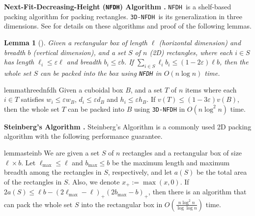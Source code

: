 \documentclass[10pt,a4paper]{amsart}
\newcommand{\kvn}[1]{#1}
\newcommand{\kvnr}[1]{}
\renewcommand{\epsilon}{\varepsilon} %
\newcommand{\boxes}{containers\xspace}
\newcommand{\NFDH}{\texttt{NFDH}\xspace}
\newcommand{\tNFDH}{\texttt{3D-NFDH}\xspace}
\newtheorem{lemma}[theorem]{Lemma}
\theoremstyle{definition}
\begin{document}

\noindent \textbf{Next-Fit-Decreasing-Height (\NFDH) Algorithm \cite{coffman1980performance}.}
\NFDH~is a shelf-based packing algorithm for packing rectangles. \tNFDH~is its generalization in three dimensions.
See  for details on these algorithms and proof of the following lemmas.

\begin{lemma}[\cite{2dks-Lpacking}]
\label{lem:2d-hfdh}
    Given a rectangular box of length $\ell$ (horizontal dimension) and breadth $b$ (vertical dimension), 
    and a set $S$ \kvn{of $n$} (2D) \kvn{rectangles}, where each $i\in S$ has length $\ell_i \le \epsilon\ell$ 
    and breadth $b_i \le \epsilon b$. If $\sum_{i\in S} \ell_i b_i \le (1-2\epsilon)\ell b$, then the whole set $S$ can be packed into the box using \NFDH in $O(n \log n)$ time.
\end{lemma}

\begin{restatable}{lemma}{threednfdh}
\label{lem:3d-hfdh}
    Given a cuboidal box $B$, and a set $T$ \kvn{of $n$} items where each $i\in T$ satisfies $w_i\le \epsilon w_B$, $d_i \le \epsilon d_B$ and $h_i \le \epsilon h_B$. If $v(T) \le (1-3\epsilon)v(B)$, then the whole set $T$ can be packed into $B$ using \tNFDH in $O(n \log^2 n)$ time.
\end{restatable}


\noindent \textbf{Steinberg's Algorithm \cite{steinberg}.} 
Steinberg's Algorithm is a commonly used 2D packing algorithm with the following performance guarantee.
\begin{restatable}{lemma}{steinb}
\label{lem:stein}
We are given a set $S$ of $n$ \kvn{rectangles} and a \kvn{rectangular box} of size $\ell \times b$. 
Let $\ell_{\max} \le \ell$ and $b_{\max} \le b$ be the maximum
\kvn{length} and maximum \kvn{breadth} among the rectangles in $S$, respectively, and let
$a(S)$ be the total area of the rectangles in $S$. Also, we denote $x_+:=
\max(x, 0)$. 
If
$2a(S) \le \ell b - (2\ell_{\max} - \ell)_+(2b_{\max}-b)_+$,
then there is an algorithm that can pack \kvn{the whole set $S$ into the rectangular box} in $O\left(\frac{n \log^2 n}{\log \log n}\right)$ time.
\end{restatable}
\end{document}
